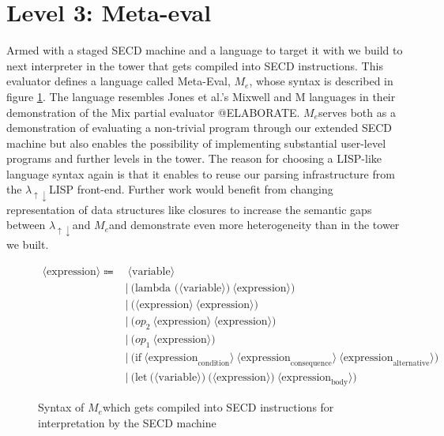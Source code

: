 \documentclass{article}
\theoremstyle{definition}
\newcommand{\mslang}{$\lambda_{\uparrow\downarrow}$}
\newcommand{\mevl}{$M_{e}$}
\begin{document}
\section{Level 3: Meta-eval}
Armed with a staged SECD machine and a language to target it with we build to next interpreter in the tower that gets compiled into SECD instructions. This evaluator defines a language called Meta-Eval, \mevl, whose syntax is described in figure \ref{fig:mevl_syntax}. The language resembles Jones et al.'s Mixwell and M languages in their demonstration of the Mix partial evaluator \cite{jones1989mix} @ELABORATE. \mevl serves both as a demonstration of evaluating a non-trivial program through our extended SECD machine but also enables the possibility of implementing substantial user-level programs and further levels in the tower. The reason for choosing a LISP-like language syntax again is that it enables to reuse our parsing infrastructure from the \mslang LISP front-end. Further work would benefit from changing representation of data structures like closures to increase the semantic gaps between \mslang and \mevl and demonstrate even more heterogeneity than in the tower we built.

\begin{figure}[ht]
\begin{align*}
	\langle \text{expression} \rangle \Coloneqq & \: \langle \text{variable} \rangle \\
															   & | \: \text{(lambda (} \langle \text{variable} \rangle\text{)} \: \langle \text{expression} \rangle\text{)} \\
															   & | \: \text{(} \langle \text{expression} \rangle \: \langle \text{expression} \rangle \text{)} \\
															   & | \: \text{(} op_{2} \: \langle \text{expression} \rangle \: \langle \text{expression} \rangle \text{)} \\
															   & | \: \text{(} op_{1} \: \langle \text{expression} \rangle \text{)} \\
															   & | \: \text{(if} \: \langle \text{expression}_\text{condition} \rangle \: \langle \text{expression}_\text{consequence} \rangle \: \langle \text{expression}_\text{alternative} \rangle \text{)} \\
															   & | \: \text{(let} \: \text{(} \langle \text{variable} \rangle \text{)} \: \text{(}\langle \text{expression} \rangle \text{)} \: \langle \text{expression}_\text{body} \rangle \text{)}
\end{align*}
\caption{Syntax of \mevl which gets compiled into SECD instructions for interpretation by the SECD machine}
\label{fig:mevl_syntax}
\end{figure}
\end{document}
